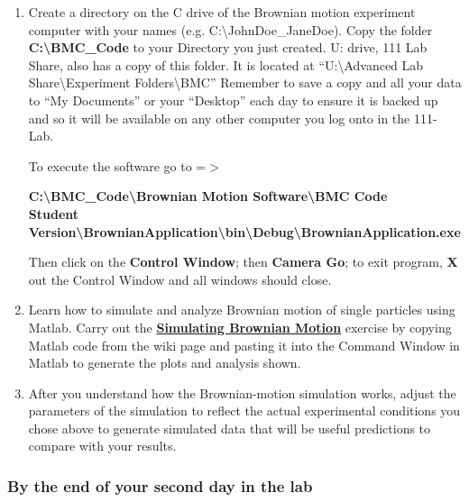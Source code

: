 \documentclass{../lab}
\begin{document}
\begin{enumerate}
    \item Create a directory on the C drive of the Brownian motion experiment computer with your names (e.g. C:\textbackslash  JohnDoe\_JaneDoe). Copy the folder \textbf{C:\textbackslash  BMC\_Code }to your Directory you just created.  U: drive, 111 Lab Share, also has a copy of this folder. It is located at ``U:\textbackslash  Advanced Lab Share\textbackslash  Experiment Folders\textbackslash  BMC'' Remember to save a copy and all your data to ``My Documents'' or your ``Desktop'' each day to ensure it is backed up and so it will be available on any other computer you log onto in the 111-Lab.

    To execute the software go to =$>$
    
    \textbf{C:\textbackslash  BMC\_Code\textbackslash  Brownian Motion Software\textbackslash  BMC Code \\
    Student Version\textbackslash  BrownianApplication\textbackslash  bin\textbackslash  Debug\textbackslash  BrownianApplication.exe}
    
    Then click on the \textbf{Control Window}; then \textbf{Camera Go}; to exit program, \textbf{X} out the Control Window and all windows should close.
    
    \item Learn how to simulate and analyze Brownian motion of single particles using Matlab. Carry out the \href{http://experimentationlab.berkeley.edu/node/83}{\textbf{Simulating Brownian Motion}} exercise by copying Matlab code from the wiki page and pasting it into the Command Window in Matlab to generate the plots and analysis shown.
    
    \item After you understand how the Brownian-motion simulation works, adjust the parameters of the simulation to reflect the actual experimental conditions you chose above to generate simulated data that will be useful predictions to compare with your results.
\end{enumerate}

\subsubsection{By the end of your second day in the lab}
\end{document}
